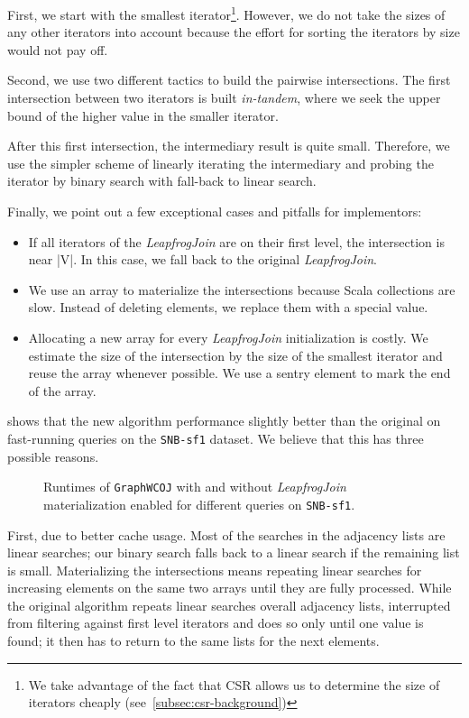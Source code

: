 First, we start with the smallest iterator\footnote{We take advantage of the fact that CSR allows us
to determine the size of iterators cheaply (see~\cref{subsec:csr-background})}.
However, we do not take the sizes of any other iterators into account because the effort for
sorting the iterators by size would not pay off.

Second, we use two different tactics to build the pairwise intersections.
The first intersection between two iterators is built \textit{in-tandem},  where we seek
the upper bound of the higher value in the smaller iterator.

After this first intersection, the intermediary result is quite small.
Therefore, we use the simpler scheme of linearly iterating the intermediary and probing
the iterator by binary search with fall-back to linear search.

Finally, we point out a few exceptional cases and pitfalls for implementors:
\begin{itemize}
    \item If all iterators of the \textit{LeapfrogJoin} are on their first level, the intersection is near |V|. In this case, we fall back
    to the original
    \textit{LeapfrogJoin}.
    \item We use an array to materialize the intersections because Scala collections are slow.
    Instead of deleting elements, we replace them with a special value.
    \item Allocating a new array for every \textit{LeapfrogJoin} initialization is costly.
    We estimate the size of the intersection by the size of the smallest iterator and reuse the array whenever possible. We use a sentry element to mark the end of the array.
\end{itemize}

 shows that the new algorithm performance slightly better than
the original on fast-running queries on the \texttt{SNB-sf1} dataset.
We believe that this has three possible reasons.

\begin{figure}[H]
    \centering
    
    \caption{Runtimes of \texttt{GraphWCOJ} with and without \textit{LeapfrogJoin} materialization
    enabled for different queries on \texttt{SNB-sf1}.}
    \label{fig:mat-nomat-short}
\end{figure}

First, due to better cache usage.
Most of the searches in the adjacency lists are linear searches;
our binary search falls back to a linear search if the remaining list is small.
Materializing the intersections means repeating linear searches for increasing elements on the same
two arrays until they are fully processed.
While the original algorithm repeats linear searches overall adjacency lists, interrupted from filtering
against first level iterators and does so only until one value is found;
it then has to return to the same lists for the next elements.

